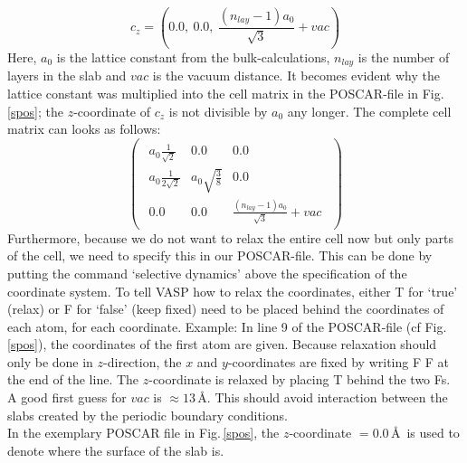 \documentclass[twoside, 11pt, titlepage, captions=nooneline, a4paper, headsepline]{scrbook}%
\begin{document}
\begin{equation}
c_z= \left(0.0,~0.0,~\frac{(n_{lay}-1)a_0}{\sqrt{3}} + vac\right)
\end{equation}
Here, $a_0$ is the lattice constant from the bulk-calculations, $n_{lay}$ is the number of layers in the slab and $vac$ is the vacuum distance. It becomes evident why the lattice constant was multiplied into the cell matrix in the POSCAR-file in Fig.\,\ref{spos}; the $z$-coordinate of $c_z$ is not divisible by $a_0$ any longer. The complete cell matrix can looks as follows:
\begin{equation}
\begin{pmatrix}\begin{matrix} a_0 \frac{1}{\sqrt{2}} & 0.0 & 0.0 \\ a_0\frac{1}{2\sqrt{2}} & a_0 \sqrt{\frac{3}{8}} & 0.0 \\0.0 & 0.0 & \frac{(n_{lay}-1)a_0}{\sqrt{3}} + vac \end{matrix} \end{pmatrix}
\end{equation}
Furthermore, because we do not want to relax the entire cell now but only parts of the cell, we need to specify this in our POSCAR-file. This can be done by putting the command `selective dynamics' above the specification of the coordinate system. To tell VASP how to relax the coordinates, either T for `true' (relax) or F for `false' (keep fixed) need to be placed behind the coordinates of each atom, for each coordinate. Example: In line 9 of the POSCAR-file (cf Fig.\,\ref{spos}), the coordinates of the first atom are given. Because relaxation should only be done in $z$-direction, the $x$ and $y$-coordinates are fixed by writing F F at the end of the line. The $z$-coordinate is relaxed by placing T behind the two Fs.\\
A good first guess for $vac$ is $\approx 13$\,\AA. This should avoid interaction between the slabs created by the periodic boundary conditions.\\
In the exemplary POSCAR file in Fig.\,\ref{spos}, the $z$-coordinate $=0.0$\,\AA~is used to denote where the surface of the slab is.\\
\end{document}
